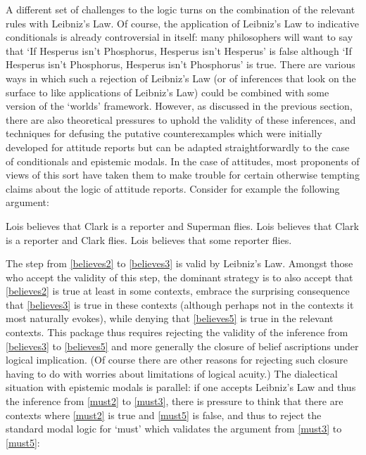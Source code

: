 \documentclass[If.tex]{subfiles}
\begin{document}

A different set of challenges to the logic turns on the combination of the relevant rules with Leibniz's Law.  Of course, the application of Leibniz's Law to indicative conditionals is already controversial in itself: many philosophers will want to say that ‘If Hesperus isn't Phosphorus, Hesperus isn't Hesperus’ is false although ‘If Hesperus isn't Phosphorus, Hesperus isn't Phosphorus’ is true.  There are various ways in which such a rejection of Leibniz's Law (or of inferences that look on the surface to like applications of Leibniz's Law) could be combined with some version of the ‘worlds’ framework.  However, as discussed in the previous section, there are also theoretical pressures to uphold the validity of these inferences, and techniques for defusing the putative counterexamples which were initially developed for attitude reports but can be adapted straightforwardly to the case of conditionals and epistemic modals.  In the case of attitudes, most proponents of views of this sort have taken them to make trouble for certain otherwise tempting claims about the logic of attitude reports.  Consider for example the following argument:
\begin{prop}
	\nitem	
	\begin{prop}
		\aitem \label{believes2}
		Lois believes that Clark is a reporter and Superman flies.
		\aitem \label{believes3}
		Lois believes that Clark is a reporter and Clark flies.
		\aitem \label{believes5}
		Lois believes that some reporter flies.	
	\end{prop}
\end{prop}
The step from \ref{believes2} to \ref{believes3} is valid by Leibniz's Law.  Amongst those who accept the validity of this step, the dominant strategy is to also accept that \ref{believes2} is true at least in some contexts, embrace the surprising consequence that \ref{believes3} is true in these contexts (although perhaps not in the contexts it most naturally evokes), while denying that \ref{believes5} is true in the relevant contexts.  This package thus requires rejecting the validity of the inference from \ref{believes3} to \ref{believes5} and more generally the closure of belief ascriptions under logical implication.  (Of course there are other reasons for rejecting such closure having to do with worries about limitations of logical acuity.)  The dialectical situation with epistemic modals is parallel: if one accepts Leibniz's Law and thus the inference from \ref{must2} to \ref{must3}, there is pressure to think that there are contexts where \ref{must2} is true and \ref{must5} is false, and thus to reject the standard modal logic for ‘must’ which validates the argument from \ref{must3} to \ref{must5}:
\end{document}
